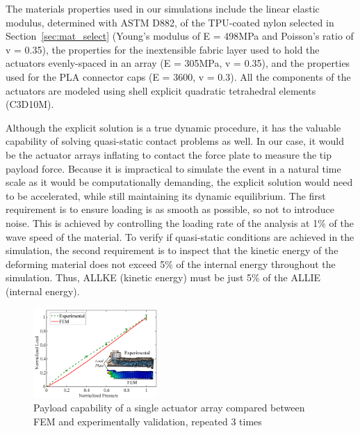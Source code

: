 \documentclass[letterpaper, 10 pt, conference]{ieeeconf}  %
\begin{document}
The materials properties used in our simulations include the linear elastic modulus, determined with ASTM D882, of the TPU-coated nylon selected in Section~\ref{sec:mat_select} (Young's modulus of E = 498MPa and Poisson’s ratio of v = 0.35), the properties for the inextensible fabric layer used to hold the actuators evenly-spaced in an array  (E = 305MPa, v = 0.35), and the properties used for the PLA connector caps (E = 3600, v = 0.3). All the components of the actuators are modeled using shell explicit quadratic tetrahedral elements (C3D10M).  

Although the explicit solution is a true dynamic procedure, it has the valuable capability of solving quasi-static contact problems as well. In our case, it would be the actuator arrays inflating to contact the force plate to measure the tip payload force. Because it is impractical to simulate the event in a natural time scale as it would be computationally demanding, the explicit solution would need to be accelerated, while still maintaining its dynamic equilibrium. The first requirement is to ensure loading is as smooth as possible, so not to introduce noise. This is achieved by controlling the loading rate of the analysis at 1\% of the wave speed of the material. To verify if quasi-static conditions are achieved in the simulation, the second requirement is to inspect that the kinetic energy of the deforming  material does not exceed 5\% of the internal energy throughout the simulation. Thus, ALLKE (kinetic energy) must be just 5\% of the ALLIE (internal energy).


\begin{figure}[t!]
\centering
\includegraphics[width=0.42\textwidth]{Figures/single_FEM_REAL}
\caption{Payload capability of a single actuator array compared between FEM and experimentally validation, repeated 3 times}
% 
\label{fig:single_fem_real}
\vspace{-1.5em}
\end{figure}
\end{document}
